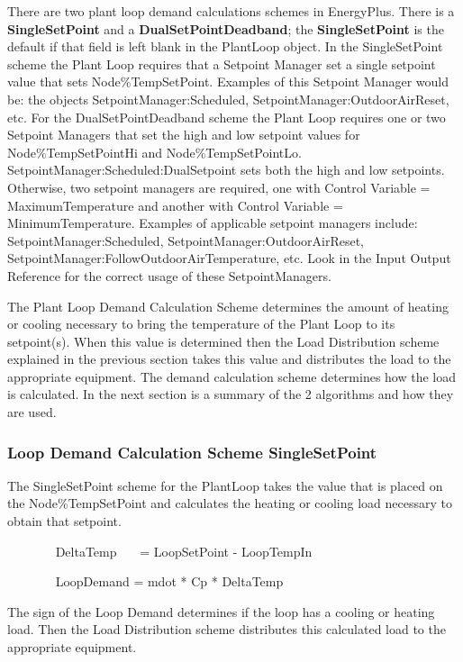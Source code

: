 There are two plant loop demand calculations schemes in EnergyPlus. There is a \textbf{SingleSetPoint} and a \textbf{DualSetPointDeadband}; the \textbf{SingleSetPoint} is the default if that field is left blank in the PlantLoop object. In the SingleSetPoint scheme the Plant Loop requires that a Setpoint Manager set a single setpoint value that sets Node\%TempSetPoint. Examples of this Setpoint Manager would be: the objects SetpointManager:Scheduled, SetpointManager:OutdoorAirReset, etc. For the DualSetPointDeadband scheme the Plant Loop requires one or two Setpoint Managers that set the high and low setpoint values for Node\%TempSetPointHi and Node\%TempSetPointLo. SetpointManager:Scheduled:DualSetpoint sets both the high and low setpoints. Otherwise, two setpoint managers are required, one with Control Variable = MaximumTemperature and another with Control Variable = MinimumTemperature. Examples of applicable setpoint managers include: SetpointManager:Scheduled, SetpointManager:OutdoorAirReset, SetpointManager:FollowOutdoorAirTemperature, etc. Look in the Input Output Reference for the correct usage of these SetpointManagers.

The Plant Loop Demand Calculation Scheme determines the amount of heating or cooling necessary to bring the temperature of the Plant Loop to its setpoint(s). When this value is determined then the Load Distribution scheme explained in the previous section takes this value and distributes the load to the appropriate equipment. The demand calculation scheme determines how the load is calculated. In the next section is a summary of the 2 algorithms and how they are used.

\subsubsection{Loop Demand Calculation Scheme SingleSetPoint}\label{loop-demand-calculation-scheme-singlesetpoint}

The SingleSetPoint scheme for the PlantLoop takes the value that is placed on the Node\%TempSetPoint and calculates the heating or cooling load necessary to obtain that setpoint.

~~~~~~~ DeltaTemp~~~ = LoopSetPoint - LoopTempIn

~~~~~~~ LoopDemand = mdot * Cp * DeltaTemp

The sign of the Loop Demand determines if the loop has a cooling or heating load. Then the Load Distribution scheme distributes this calculated load to the appropriate equipment.

